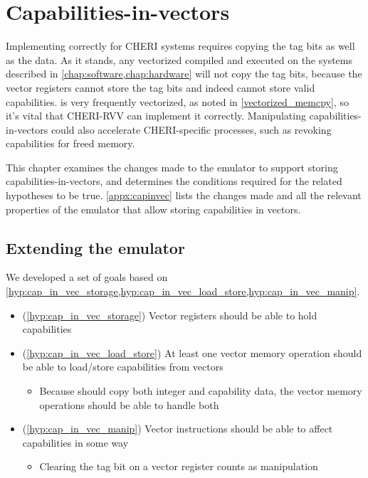 \documentclass[../thesis]{subfiles}
\begin{document}
\chapter{Capabilities-in-vectors\label{chap:capinvec}}
Implementing  correctly for CHERI systems requires copying the tag bits as well as the data.
As it stands, any vectorized  compiled and executed on the systems described in \cref{chap:software,chap:hardware} will not copy the tag bits, because the vector registers cannot store the tag bits and indeed cannot store valid capabilities.
 is very frequently vectorized, as noted in \cref{vectorized_memcpy}, so it's vital that CHERI-RVV can implement it correctly.
Manipulating capabilities-in-vectors could also accelerate CHERI-specific processes, such as revoking capabilities for freed memory\cite{xiaCHERIvokeCharacterisingPointer2019}.

This chapter examines the changes made to the emulator to support storing capabilities-in-vectors, and determines the conditions required for the related hypotheses to be true.
\cref{appx:capinvec} lists the changes made and all the relevant properties of the emulator that allow storing capabilities in vectors.

\section{Extending the emulator}
We developed a set of goals based on \cref{hyp:cap_in_vec_storage,hyp:cap_in_vec_load_store,hyp:cap_in_vec_manip}.
\begin{itemize}
    \item (\cref{hyp:cap_in_vec_storage}) Vector registers should be able to hold capabilities 
    \item (\cref{hyp:cap_in_vec_load_store}) At least one vector memory operation should be able to load/store capabilities from vectors
    \begin{itemize}
        \item Because  should copy both integer and capability data, the vector memory operations should be able to handle both
    \end{itemize}
    \item (\cref{hyp:cap_in_vec_manip}) Vector instructions should be able to affect capabilities in some way
    \begin{itemize}
        \item Clearing the tag bit on a vector register counts as manipulation
    \end{itemize}
\end{itemize}
\end{document}
